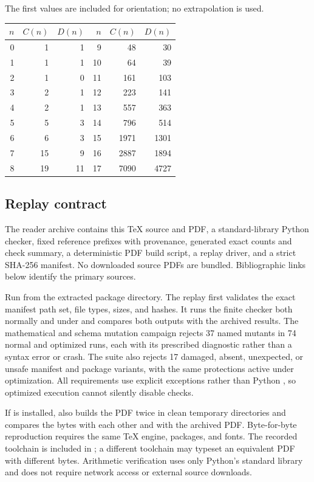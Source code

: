 \documentclass[11pt,letterpaper]{article}
\theoremstyle{definition}\newtheorem{remark}[theorem]{Remark}
\begin{document}
The first values are included for orientation; no extrapolation is used.
\begin{center}
\begin{tabular}{r rr@{\qquad}r rr}
\toprule
$n$&$C(n)$&$D(n)$&$n$&$C(n)$&$D(n)$\\
\midrule
0&1&1&9&48&30\\
1&1&1&10&64&39\\
2&1&0&11&161&103\\
3&2&1&12&223&141\\
4&2&1&13&557&363\\
5&5&3&14&796&514\\
6&6&3&15&1971&1301\\
7&15&9&16&2887&1894\\
8&19&11&17&7090&4727\\
\bottomrule
\end{tabular}
\end{center}

\subsection{Replay contract}

The reader archive contains this TeX source and PDF, a standard-library Python
checker, fixed reference prefixes with provenance, generated exact counts and
check summary, a deterministic PDF build script, a replay driver, and a strict
SHA-256 manifest. No downloaded source PDFs are bundled. Bibliographic links below identify
the primary sources.

Run  from the extracted package directory. The replay
first validates the exact manifest path set, file types, sizes, and hashes.
It runs the finite checker both normally and under  and
compares both outputs with the archived results. The mathematical and schema
mutation campaign rejects 37 named mutants in 74 normal and optimized runs,
each with its prescribed diagnostic rather than a syntax error or crash. The suite also rejects 17 damaged, absent, unexpected, or unsafe manifest
and package variants, with the same protections active under optimization. All requirements use
explicit exceptions rather than Python , so optimized execution
cannot silently disable checks.

If  is installed,  also builds
the PDF twice in clean temporary directories and compares the bytes with each
other and with the archived PDF. Byte-for-byte reproduction requires the same
TeX engine, packages, and fonts. The recorded toolchain is included in
; a different toolchain may typeset an equivalent
PDF with different bytes. Arithmetic verification uses only Python's standard
library and does not require network access or external source downloads.
\end{document}

